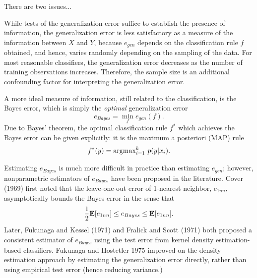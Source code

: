 \documentclass[12pt]{article}
\begin{document}
There are two issues...

While tests of the generalization error suffice to establish the
presence of information, the generalization error is less satisfactory
as a measure of the information between $X$ and $Y$, because
$e_{gen}$ depends on the classification rule $f$ obtained, and hence,
varies randomly depending on the sampling of the data.  For most
reasonable classifiers, the generalization error decreases as the
number of training observations increases.  Therefore, the sample size
is an additional confounding factor for interpreting the
generalization error.

A more ideal measure of information, still related to the
classification, is the Bayes error, which is simply the \emph{optimal}
generalization error
\[
e_{Bayes} = \min_f e_{gen}(f).
\]
Due to Bayes' theorem, the optimal classification rule $f^*$ which
achieves the Bayes error can be given explicitly: it is the maximum a
posteriori (MAP) rule
\[
f^*(y) = \text{argmax}_{i=1}^k\ p(y|x_i).
\]

Estimating $e_{Bayes}$ is much more difficult in practice than
estimating $e_{gen}$; however, nonparametric estimators of $e_{Bayes}$
have been proposed in the literature.  Cover (1969) first noted that
the leave-one-out error of 1-nearest neighbor, $e_{1nn}$,
asymptotically bounds the Bayes error in the sense that
\[
\frac{1}{2}\textbf{E}[e_{1nn}] \leq e_{Bayes} \leq \textbf{E}[e_{1nn}].
\]
Later, Fukunaga and Kessel (1971) and Fralick and Scott (1971) both
proposed a consistent estimator of $e_{Bayes}$ using the test error
from kernel density estimation-based classifiers.  Fukunaga and
Hostetler 1975 improved on the density estimation approach by
estimating the generalization error directly, rather than using
empirical test error (hence reducing variance.)
\end{document}

